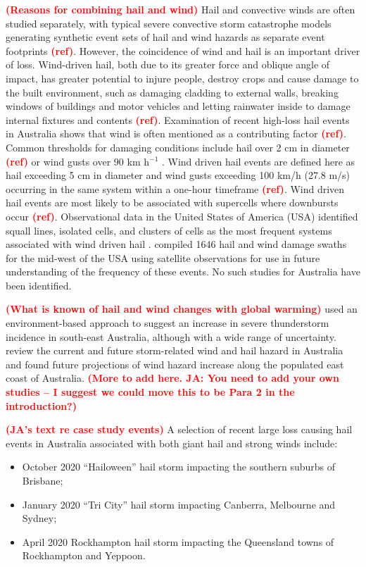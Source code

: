 \documentclass[]{agujournal2019}\usepackage[]{graphicx}\usepackage[]{xcolor}
\newcommand*{\todo}[1]{\textbf{\textcolor{red}{(#1)}}}
\newcommand*{\mref}{\todo{ref}}
\begin{document}
\todo{Reasons for combining hail and wind} Hail and convective winds are often
studied separately, with typical severe convective storm catastrophe models
generating synthetic event sets of hail and wind hazards as separate event
footprints \mref{}. However, the coincidence of wind and hail is an important
driver of loss. Wind-driven hail, both due to its greater force and oblique
angle of impact, has greater potential to injure people, destroy crops
\cite{Changnon_JAMC_1967, Towery_JAMC_1976} and cause damage to the built
environment, such as damaging cladding to external walls, breaking windows of
buildings and motor vehicles and letting rainwater inside to damage internal
fixtures and contents \mref{}. Examination of recent high-loss hail events in
Australia shows that wind is often mentioned as a contributing factor \mref{}.
Common thresholds for damaging conditions include hail over 2 cm in diameter
\mref{} or wind gusts over 90 km h$^{-1}$ \cite{Allen_2018}. Wind driven hail
events are defined here as hail exceeding 5 cm in diameter  and wind gusts
exceeding 100 km/h (27.8 m/s) occurring in the same system within a one-hour
timeframe \mref{}. Wind driven hail events are most likely to be associated with
supercells where downbursts occur \mref{}. Observational data in the United
States of America (USA) identified squall lines, isolated cells, and clusters of
cells as the most frequent systems associated with wind driven hail
\cite{Carletta_2010}. \cite{Bell_WF_2023} compiled 1646 hail and wind damage
swaths for the mid-west of the USA using satellite observations for use in
future understanding of the frequency of these events. No such studies for
Australia have been identified.

\todo{What is known of hail and wind changes with global warming}
\cite{Allen_JC_2014} used an environment-based approach to suggest an increase
in severe thunderstorm incidence in south-east Australia, although with a wide
range of uncertainty. \cite{Walsh_CC_2016} review the current and future
storm-related wind and hail hazard in Australia and found future projections of
wind hazard increase along the populated east coast of Australia. \todo{More to
add here. JA: You need to add your own studies – I suggest we could move this to
be Para 2 in the introduction?}

\todo{JA's text re case study events} A selection of recent large loss causing hail events in Australia associated with both giant hail and strong winds include:

\begin{itemize}
\item October 2020 ``Hailoween'' hail storm impacting the southern suburbs of
Brisbane;
\item January 2020 ``Tri City'' hail storm impacting Canberra, Melbourne and
Sydney;
\item April 2020 Rockhampton hail storm impacting the Queensland towns of
Rockhampton and Yeppoon.
\end{itemize}
\end{document}

